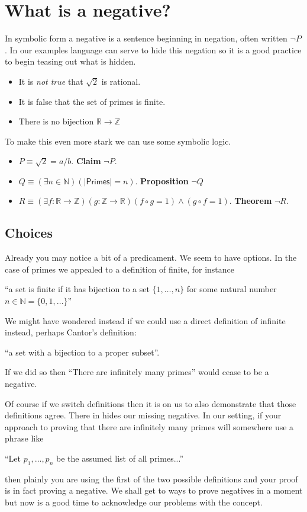 \section{What is a negative?}
In symbolic form a negative is a sentence beginning in negation, 
often written $\neg P$.  In our examples language can serve to 
hide this negation so it is a good practice to begin teasing out 
what is hidden.
\begin{itemize}
    \item It is \emph{not true} that $\sqrt{2}$ is rational.
    \item It is false that the set of primes is finite.
    \item There is no bijection $\mathbb{R}\to \mathbb{Z}$
\end{itemize}
To make this even more stark we can use some symbolic logic.
\begin{itemize}
    \item $P\equiv \sqrt{2}=a/b$.  \textbf{Claim} $\neg P$.
    \item $Q\equiv (\exists n\in \mathbb{N})(|\mathsf{Primes}|=n)$. 
    \textbf{Proposition} $\neg Q$
    \item $R\equiv (\exists f:\mathbb{R}\to \mathbb{Z})(g:\mathbb{Z}\to \mathbb{R})(f\circ g=1)\wedge (g\circ f=1)$.
    \textbf{Theorem} $\neg R$.
\end{itemize}

\subsection*{Choices}
Already you may notice a bit of a predicament.  We seem to have options.  In the
case of primes we appealed to a definition of finite, for instance
\begin{center} 
    ``a set is finite
if it has bijection to a set $\{1,\ldots,n\}$ for some natural number $n\in
\mathbb{N}=\{0,1,\ldots\}$''
\end{center}
We might have wondered instead if we could use a direct definition of 
infinite instead, perhaps Cantor's definition:
\begin{center}
    ``a set with a bijection to a proper subset''.
\end{center}
If we did so then ``There are infinitely many primes'' would cease 
to be a negative.  

Of course if we switch definitions then 
it is on us to also demonstrate that those definitions agree.
There in hides our missing negative.
In our setting, if your approach to proving that there are 
infinitely many primes will somewhere use a phrase like 
\begin{center}
    ``Let $p_1,\ldots,p_n$ be the assumed list of all primes...''
\end{center}
then plainly you are using the first of the two possible definitions 
and your proof is in fact proving a negative.  We shall get to ways to 
prove negatives in a moment but now is a good time to acknowledge our 
problems with the concept.

